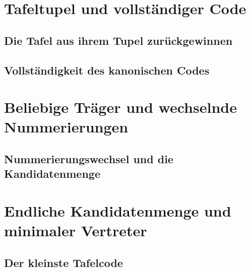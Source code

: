 \section{Tafeltupel und vollständiger Code}
\subsection{Die Tafel aus ihrem Tupel zurückgewinnen}
\hypertarget{table-isomorphisms.proof.FiniteSemigroupTableTupleInjective}{}


\subsection{Vollständigkeit des kanonischen Codes}
\hypertarget{table-isomorphisms.proof.FiniteSemigroupCanonicalTableCodeComplete}{}
\begingroup
\renewcommand{\theformulaThm}{37.4.1.9}

\endgroup

\section{Beliebige Träger und wechselnde Nummerierungen}
\hypertarget{table-isomorphisms.proof.arbitrary-carriers}{}



\subsection{Nummerierungswechsel und die Kandidatenmenge}
\hypertarget{table-isomorphisms.proof.renumbering}{}


\section{Endliche Kandidatenmenge und minimaler Vertreter}
\hypertarget{table-isomorphisms.proof.finite-candidates}{}

\subsection{Der kleinste Tafelcode}
\hypertarget{table-isomorphisms.proof.minimal-code}{}
